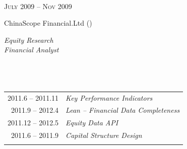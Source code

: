 \documentclass[10pt]{article} %
\begin{document}
\begin{minipage}[t]{0.5\textwidth}
\normalsize{}\\[2pt]


{\raggedleft\textsc{\rm July 2009 -- Nov 2009}\par}

\raggedright{\large\rm ChinaScope Financial.Ltd ()}\\
\raggedright{\textit{Equity Research \\Financial Analyst}\\[5pt]}

\normalsize{}\\[2pt]



\section{} 

\begin{tabular}{rl}
2011.6 -- 2011.11&\textsl{Key Performance Indicators}\\
2011.9 -- 2012.4&\textsl{Lean -- Financial Data Completeness}\\
2011.12 -- 2012.5&\textsl{Equity Data API}\\
2011.6 -- 2011.9&\textsl{Capital Structure Design}\\
&\\

\end{tabular}\\

\end{minipage} %
\end{document}
